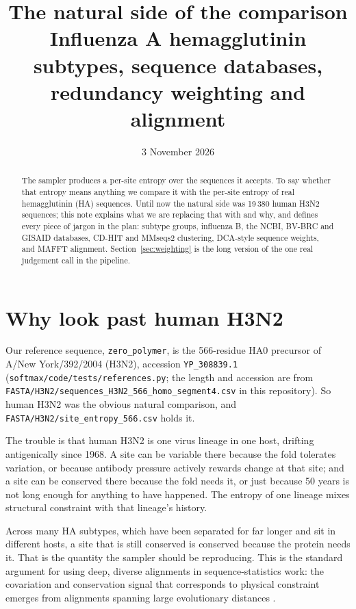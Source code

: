 \documentclass[11pt,a4paper]{article}
\title{The natural side of the comparison\\
       \large Influenza A hemagglutinin subtypes, sequence databases,\\
       redundancy weighting and alignment}
\author{}
\date{3 November 2026}
\newcommand{\file}[1]{\texttt{#1}}
\begin{document}
\maketitle

\begin{abstract}
\noindent
The sampler produces a per-site entropy over the sequences it accepts. To say
whether that entropy means anything we compare it with the per-site entropy of
real hemagglutinin (HA) sequences. Until now the natural side was 19\,380 human
H3N2 sequences; this note explains what we are replacing that with and why, and
defines every piece of jargon in the plan: subtype groups, influenza B, the
NCBI, BV-BRC and GISAID databases, CD-HIT and MMseqs2 clustering, DCA-style
sequence weights, and MAFFT alignment. Section~\ref{sec:weighting} is the long
version of the one real judgement call in the pipeline.
\end{abstract}

\section{Why look past human H3N2}

Our reference sequence, \file{zero\_polymer}, is the 566-residue HA0 precursor
of A/New York/392/2004 (H3N2), accession \file{YP\_308839.1}
(\file{softmax/code/tests/references.py}; the length and accession are from
\file{FASTA/H3N2/sequences\_H3N2\_566\_homo\_segment4.csv} in this repository).
So human H3N2 was the obvious natural comparison, and
\file{FASTA/H3N2/site\_entropy\_566.csv} holds it.

The trouble is that human H3N2 is one virus lineage in one host, drifting
antigenically since 1968. A site can be variable there because the fold
tolerates variation, or because antibody pressure actively rewards change at
that site; and a site can be conserved there because the fold needs it, or just
because 50 years is not long enough for anything to have happened. The entropy
of one lineage mixes structural constraint with that lineage's history.

Across many HA subtypes, which have been separated for far longer and sit in
different hosts, a site that is still conserved is conserved because the protein
needs it. That is the quantity the sampler should be reproducing. This is the
standard argument for using deep, diverse alignments in sequence-statistics
work: the covariation and conservation signal that corresponds to physical
constraint emerges from alignments spanning large evolutionary distances
\cite{morcos2011,cocco2018}.
\end{document}
